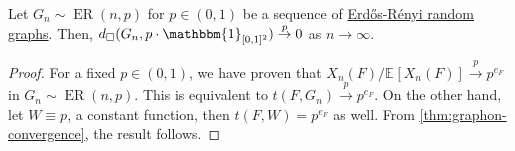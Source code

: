 \begin{corollary}\label{col:Erdős-Rényi-random-graphs-converge-to-constant-graphon}
	Let \(G_n \sim \operatorname{ER}(n, p) \) for \(p \in (0, 1)\) be a sequence of \hyperref[def:Erdős-Rényi-random-graph]{Erdős-Rényi random graphs}. Then, \(d_{\square} (G_n, p \cdot \mathbbm{1}_{[0, 1]^2} ) \overset{p}{\to} 0\) as \(n \to \infty \).
\end{corollary}
\begin{proof}
	For a fixed \(p \in (0, 1)\), we have proven that \(X_n(F) / \mathbb{E}_{}[X_n(F)] \overset{p}{\to} p^{e_F}\) in \(G_n \sim \operatorname{ER}(n, p) \). This is equivalent to \(t(F, G_n) \overset{p}{\to} p^{e_F}\). On the other hand, let \(W \equiv p\), a constant function, then \(t(F, W) = p^{e_F}\) as well. From \autoref{thm:graphon-convergence}, the result follows.
\end{proof}